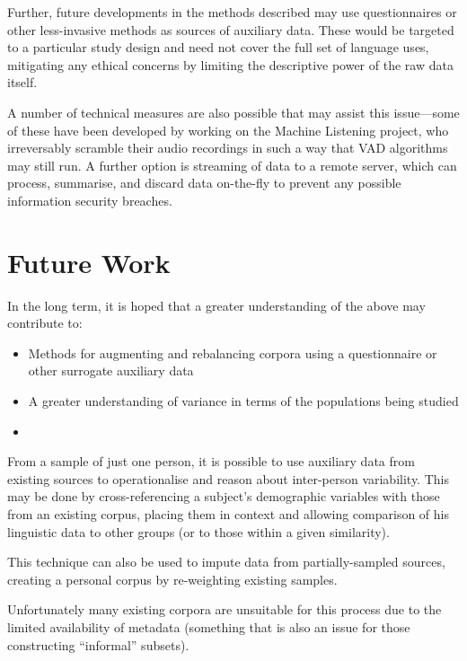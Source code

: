Further, future developments in the methods described may use questionnaires or other less-invasive methods as sources of auxiliary data.  These would be targeted to a particular study design and need not cover the full set of language uses, mitigating any ethical concerns by limiting the descriptive power of the raw data itself.

A number of technical measures are also possible that may assist this issue---some of these have been developed by  working on the Machine Listening project, who irreversably scramble their audio recordings in such a way that VAD algorithms may still run.  A further option is streaming of data to a remote server, which can process, summarise, and discard data on-the-fly to prevent any possible information security breaches.








\section{Future Work}

In the long term, it is hoped that a greater understanding of the above may contribute to:

\begin{itemize}
    \item Methods for augmenting and rebalancing corpora using a questionnaire or other surrogate auxiliary data
    \item A greater understanding of variance in terms of the populations being studied
    \item 
\end{itemize}

From a sample of just one person, it is possible to use auxiliary data from existing sources to operationalise and reason about inter-person variability.  This may be done by cross-referencing a subject's demographic variables with those from an existing corpus, placing them in context and allowing comparison of his linguistic data to other groups (or to those within a given similarity).

This technique can also be used to impute data from partially-sampled sources, creating a personal corpus by re-weighting existing samples.

Unfortunately many existing corpora are unsuitable for this process due to the limited availability of metadata (something that is also an issue for those constructing ``informal'' subsets).






